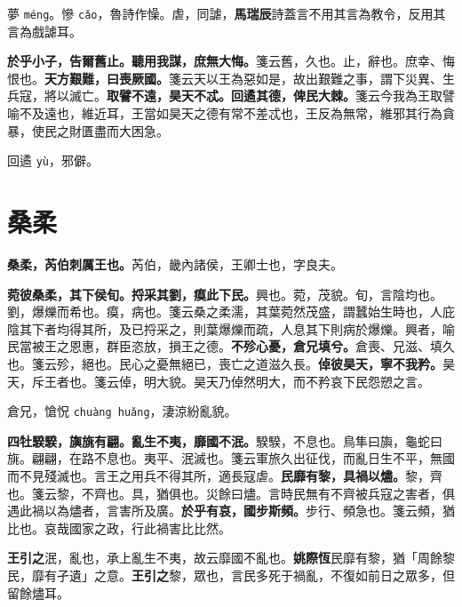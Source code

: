 \begin{quoting}夢 \texttt{méng}。慘 \texttt{cǎo}，魯詩作懆。虐，同謔，\textbf{馬瑞辰}詩蓋言不用其言為教令，反用其言為戲謔耳。\end{quoting}

\textbf{於乎小子，告爾舊止。聽用我謀，庶無大悔。}{\footnotesize 箋云舊，久也。止，辭也。庶幸、悔恨也。}\textbf{天方艱難，曰喪厥國。}{\footnotesize 箋云天以王為惡如是，故出艱難之事，謂下災異、生兵寇，將以滅亡。}\textbf{取譬不遠，昊天不忒。回遹其德，俾民大棘。}{\footnotesize 箋云今我為王取譬喻不及遠也，維近耳，王當如昊天之德有常不差忒也，王反為無常，維邪其行為貪暴，使民之財匱盡而大困急。}

\begin{quoting}回遹 \texttt{yù}，邪僻。\end{quoting}

\section{桑柔}


\textbf{桑柔，芮伯刺厲王也。}{\footnotesize 芮伯，畿內諸侯，王卿士也，字良夫。}

\textbf{菀彼桑柔，其下侯旬。捋采其劉，瘼此下民。}{\footnotesize 興也。菀，茂貌。旬，言陰均也。劉，爆爍而希也。瘼，病也。箋云桑之柔濡，其葉菀然茂盛，謂蠶始生時也，人庇陰其下者均得其所，及已捋采之，則葉爆爍而疏，人息其下則病於爆爍。興者，喻民當被王之恩惠，群臣恣放，損王之德。}\textbf{不殄心憂，倉兄填兮。}{\footnotesize 倉喪、兄滋、填久也。箋云殄，絕也。民心之憂無絕已，喪亡之道滋久長。}\textbf{倬彼昊天，寧不我矜。}{\footnotesize 昊天，斥王者也。箋云倬，明大貌。昊天乃倬然明大，而不矜哀下民怨愬之言。}

\begin{quoting}倉兄，愴怳 \texttt{chuàng huǎng}，淒涼紛亂貌。\end{quoting}

\textbf{四牡騤騤，旟旐有翩。亂生不夷，靡國不泯。}{\footnotesize 騤騤，不息也。鳥隼曰旟，龜蛇曰旐。翩翩，在路不息也。夷平、泯滅也。箋云軍旅久出征伐，而亂日生不平，無國而不見殘滅也。言王之用兵不得其所，適長寇虐。}\textbf{民靡有黎，具禍以燼。}{\footnotesize 黎，齊也。箋云黎，不齊也。具，猶俱也。災餘曰燼。言時民無有不齊被兵寇之害者，俱遇此禍以為燼者，言害所及廣。}\textbf{於乎有哀，國步斯頻。}{\footnotesize 步行、頻急也。箋云頻，猶比也。哀哉國家之政，行此禍害比比然。}

\begin{quoting}\textbf{王引之}泯，亂也，承上亂生不夷，故云靡國不亂也。\textbf{姚際恆}民靡有黎，猶「周餘黎民，靡有孑遺」之意。\textbf{王引之}黎，眾也，言民多死于禍亂，不復如前日之眾多，但留餘燼耳。\end{quoting}

